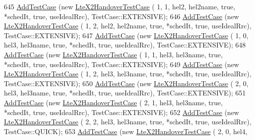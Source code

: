 \begin{DoxyCode}
645           \hyperlink{classns3_1_1TestCase_a3718088e3eefd5d6454569d2e0ddd835}{AddTestCase} (\textcolor{keyword}{new} \hyperlink{classLteX2HandoverTestCase}{LteX2HandoverTestCase} (  1,    1,    hel2, 
      hel2name, \textcolor{keyword}{true}, *schedIt, \textcolor{keyword}{true},  useIdealRrc), TestCase::EXTENSIVE);
646           \hyperlink{classns3_1_1TestCase_a3718088e3eefd5d6454569d2e0ddd835}{AddTestCase} (\textcolor{keyword}{new} \hyperlink{classLteX2HandoverTestCase}{LteX2HandoverTestCase} (  1,    2,    hel2, 
      hel2name, \textcolor{keyword}{true}, *schedIt, \textcolor{keyword}{true},  useIdealRrc), TestCase::EXTENSIVE);
647           \hyperlink{classns3_1_1TestCase_a3718088e3eefd5d6454569d2e0ddd835}{AddTestCase} (\textcolor{keyword}{new} \hyperlink{classLteX2HandoverTestCase}{LteX2HandoverTestCase} (  1,    0,    hel3, 
      hel3name, \textcolor{keyword}{true}, *schedIt, \textcolor{keyword}{true},  useIdealRrc), TestCase::EXTENSIVE);
648           \hyperlink{classns3_1_1TestCase_a3718088e3eefd5d6454569d2e0ddd835}{AddTestCase} (\textcolor{keyword}{new} \hyperlink{classLteX2HandoverTestCase}{LteX2HandoverTestCase} (  1,    1,    hel3, 
      hel3name, \textcolor{keyword}{true}, *schedIt, \textcolor{keyword}{true},  useIdealRrc), TestCase::EXTENSIVE);
649           \hyperlink{classns3_1_1TestCase_a3718088e3eefd5d6454569d2e0ddd835}{AddTestCase} (\textcolor{keyword}{new} \hyperlink{classLteX2HandoverTestCase}{LteX2HandoverTestCase} (  1,    2,    hel3, 
      hel3name, \textcolor{keyword}{true}, *schedIt, \textcolor{keyword}{true},  useIdealRrc), TestCase::EXTENSIVE);
650           \hyperlink{classns3_1_1TestCase_a3718088e3eefd5d6454569d2e0ddd835}{AddTestCase} (\textcolor{keyword}{new} \hyperlink{classLteX2HandoverTestCase}{LteX2HandoverTestCase} (  2,    0,    hel3, 
      hel3name, \textcolor{keyword}{true}, *schedIt, \textcolor{keyword}{true},  useIdealRrc), TestCase::EXTENSIVE);
651           \hyperlink{classns3_1_1TestCase_a3718088e3eefd5d6454569d2e0ddd835}{AddTestCase} (\textcolor{keyword}{new} \hyperlink{classLteX2HandoverTestCase}{LteX2HandoverTestCase} (  2,    1,    hel3, 
      hel3name, \textcolor{keyword}{true}, *schedIt, \textcolor{keyword}{true},  useIdealRrc), TestCase::EXTENSIVE);
652           \hyperlink{classns3_1_1TestCase_a3718088e3eefd5d6454569d2e0ddd835}{AddTestCase} (\textcolor{keyword}{new} \hyperlink{classLteX2HandoverTestCase}{LteX2HandoverTestCase} (  2,    2,    hel3, 
      hel3name, \textcolor{keyword}{true}, *schedIt, \textcolor{keyword}{true},  useIdealRrc), TestCase::QUICK);
653           \hyperlink{classns3_1_1TestCase_a3718088e3eefd5d6454569d2e0ddd835}{AddTestCase} (\textcolor{keyword}{new} \hyperlink{classLteX2HandoverTestCase}{LteX2HandoverTestCase} (  2,    0,    hel4, 

\end{DoxyCode}
